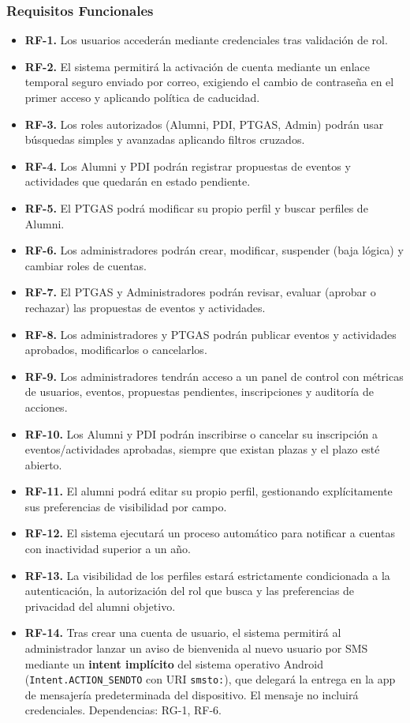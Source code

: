 \documentclass{report}
\begin{document}
\subsubsection{Requisitos Funcionales}
\begin{itemize}
    \item \textbf{RF-1.} Los usuarios accederán mediante credenciales tras validación de rol.
    \item \textbf{RF-2.} El sistema permitirá la activación de cuenta mediante un enlace temporal seguro enviado por correo, exigiendo el cambio de contraseña en el primer acceso y aplicando política de caducidad.
    \item \textbf{RF-3.} Los roles autorizados (Alumni, PDI, PTGAS, Admin) podrán usar búsquedas simples y avanzadas aplicando filtros cruzados.
    \item \textbf{RF-4.} Los Alumni y PDI podrán registrar propuestas de eventos y actividades que quedarán en estado pendiente.
    \item \textbf{RF-5.} El PTGAS podrá modificar su propio perfil y buscar perfiles de Alumni.
    \item \textbf{RF-6.} Los administradores podrán crear, modificar, suspender (baja lógica) y cambiar roles de cuentas.
    \item \textbf{RF-7.} El PTGAS y Administradores podrán revisar, evaluar (aprobar o rechazar) las propuestas de eventos y actividades.
    \item \textbf{RF-8.} Los administradores y PTGAS podrán publicar eventos y actividades aprobados, modificarlos o cancelarlos.
    \item \textbf{RF-9.} Los administradores tendrán acceso a un panel de control con métricas de usuarios, eventos, propuestas pendientes, inscripciones y auditoría de acciones.
    \item \textbf{RF-10.} Los Alumni y PDI podrán inscribirse o cancelar su inscripción a eventos/actividades aprobadas, siempre que existan plazas y el plazo esté abierto.
    \item \textbf{RF-11.} El alumni podrá editar su propio perfil, gestionando explícitamente sus preferencias de visibilidad por campo.
    \item \textbf{RF-12.} El sistema ejecutará un proceso automático para notificar a cuentas con inactividad superior a un año.
    \item \textbf{RF-13.} La visibilidad de los perfiles estará estrictamente condicionada a la autenticación, la autorización del rol que busca y las preferencias de privacidad del alumni objetivo.
    \item \textbf{RF-14.} Tras crear una cuenta de usuario, el sistema permitirá al administrador lanzar un aviso de bienvenida al nuevo usuario por SMS mediante un \textbf{intent implícito} del sistema operativo Android (\texttt{Intent.ACTION\_SENDTO} con URI \texttt{smsto:}), que delegará la entrega en la app de mensajería predeterminada del dispositivo. El mensaje no incluirá credenciales. Dependencias: RG-1, RF-6.
\end{itemize}
\end{document}
